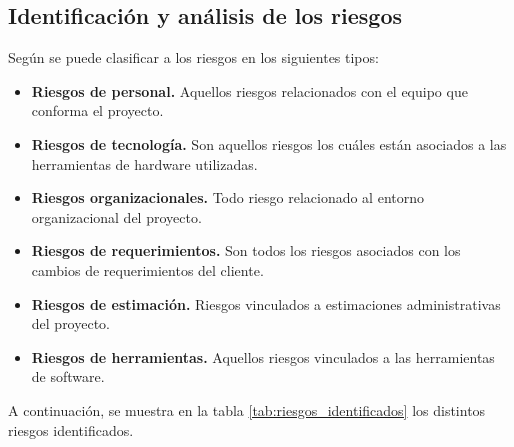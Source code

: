 \subsection{Identificación y análisis de los riesgos}

Según \parencite{ingsoftian} se puede clasificar a los riesgos en los siguientes tipos:

\begin{itemize}
  \item \textbf{Riesgos de personal.} Aquellos riesgos relacionados con el equipo que conforma el proyecto.
	\item \textbf{Riesgos de tecnología.} Son aquellos riesgos los cuáles están asociados a las herramientas de hardware utilizadas.
  \item \textbf{Riesgos organizacionales.} Todo riesgo relacionado al entorno organizacional del proyecto.
  \item \textbf{Riesgos de requerimientos.} Son todos los riesgos asociados con los cambios de requerimientos del cliente.
  \item \textbf{Riesgos de estimación.} Riesgos vinculados a estimaciones administrativas del proyecto.
  \item \textbf{Riesgos de herramientas.} Aquellos riesgos vinculados a las herramientas de software.
\end{itemize}

A continuación, se muestra en la tabla \ref{tab:riesgos_identificados} los distintos riesgos identificados.

